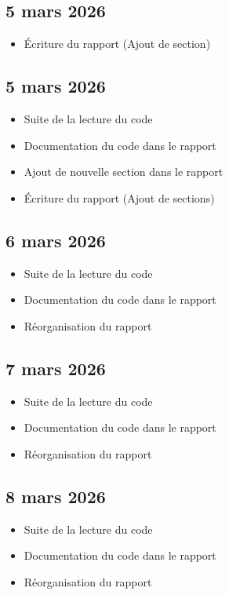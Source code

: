 \subsection*{5 mars 2026}
\begin{itemize}
    \item Écriture du rapport (Ajout de section)
\end{itemize}

\subsection*{5 mars 2026}
\begin{itemize}
    \item Suite de la lecture du code
    \item Documentation du code dans le rapport
    \item Ajout de nouvelle section dans le rapport
    \item Écriture du rapport (Ajout de sections)
\end{itemize}

\subsection*{6 mars 2026}
\begin{itemize}
    \item Suite de la lecture du code
    \item Documentation du code dans le rapport
    \item Réorganisation du rapport
\end{itemize}

\subsection*{7 mars 2026}
\begin{itemize}
    \item Suite de la lecture du code
    \item Documentation du code dans le rapport
    \item Réorganisation du rapport
\end{itemize}

\subsection*{8 mars 2026}
\begin{itemize}
    \item Suite de la lecture du code
    \item Documentation du code dans le rapport
    \item Réorganisation du rapport
\end{itemize}



